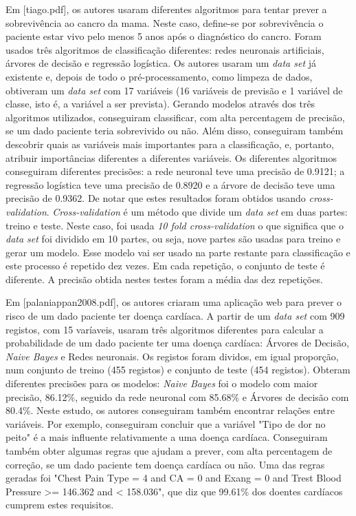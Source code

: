 Em [tiago.pdf], os autores usaram diferentes algoritmos para tentar prever a sobrevivência ao cancro da mama. Neste caso, define-se por sobrevivência o paciente estar vivo pelo menos 5 anos após o diagnóstico do cancro. Foram usados três algoritmos de classificação diferentes: redes neuronais artificiais, árvores de decisão e regressão logística. Os autores usaram um \textit{data set} já existente e, depois de todo o pré-processamento, como limpeza de dados, obtiveram um \textit{data set} com 17 variáveis (16 variáveis de previsão e 1 variável de classe, isto é, a variável a ser prevista). Gerando modelos através dos três algoritmos utilizados, conseguiram classificar, com alta percentagem de precisão, se um dado paciente teria sobrevivido ou não. Além disso, conseguiram também descobrir quais as variáveis mais importantes para a classificação, e, portanto, atribuir importâncias diferentes a diferentes variáveis. Os diferentes algoritmos conseguiram diferentes precisões: a rede neuronal teve uma precisão de 0.9121; a regressão logística teve uma precisão de 0.8920 e a árvore de decisão teve uma precisão de 0.9362. De notar que estes resultados foram obtidos usando \textit{cross-validation}. \textit{Cross-validation} é um método que divide um \textit{data set} em duas partes: treino e teste. Neste caso, foi usada \textit{10 fold cross-validation} o que significa que o \textit{data set} foi dividido em 10 partes, ou seja, nove partes são usadas para treino e gerar um modelo. Esse modelo vai ser usado na parte restante para classificação e este processo é repetido dez vezes. Em cada repetição, o conjunto de teste é diferente. A precisão obtida nestes testes foram a média das dez repetições.

Em [palaniappan2008.pdf], os autores criaram uma aplicação web para prever o risco de um dado paciente ter doença cardíaca. A partir de um \textit{data set} com 909 registos, com 15 varíaveis, usaram três algoritmos diferentes para calcular a probabilidade de um dado paciente ter uma doença cardíaca: Árvores de Decisão, \textit{Naive Bayes} e Redes neuronais. Os registos foram dividos, em igual proporção, num conjunto de treino (455 registos) e conjunto de teste (454 registos). Obteram diferentes precisões para os modelos: \textit{Naive Bayes} foi o modelo com maior precisão, 86.12\%, seguido da rede neuronal com 85.68\% e Árvores de decisão com 80.4\%. Neste estudo, os autores conseguiram também encontrar relações entre variáveis. Por exemplo, conseguiram concluir que a variável "Tipo de dor no peito" é a mais influente relativamente a uma doença cardíaca. Conseguiram também obter algumas regras que ajudam a prever, com alta percentagem de correção, se um dado paciente tem doença cardíaca ou não. Uma das regras geradas foi "Chest Pain Type = 4 and CA = 0 and Exang = 0 and Trest Blood Pressure >= 146.362 and < 158.036", que diz que 99.61\% dos doentes cardíacos cumprem estes requisitos. 

